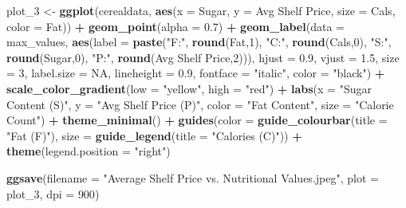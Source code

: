 \documentclass[
]{article}
\newenvironment{Shaded}{\begin{snugshade}}{\end{snugshade}}
\newcommand{\AttributeTok}[1]{\textcolor[rgb]{0.13,0.29,0.53}{#1}}
\newcommand{\ConstantTok}[1]{\textcolor[rgb]{0.56,0.35,0.01}{#1}}
\newcommand{\DecValTok}[1]{\textcolor[rgb]{0.00,0.00,0.81}{#1}}
\newcommand{\FloatTok}[1]{\textcolor[rgb]{0.00,0.00,0.81}{#1}}
\newcommand{\FunctionTok}[1]{\textcolor[rgb]{0.13,0.29,0.53}{\textbf{#1}}}
\newcommand{\NormalTok}[1]{#1}
\newcommand{\OtherTok}[1]{\textcolor[rgb]{0.56,0.35,0.01}{#1}}
\newcommand{\SpecialCharTok}[1]{\textcolor[rgb]{0.81,0.36,0.00}{\textbf{#1}}}
\newcommand{\StringTok}[1]{\textcolor[rgb]{0.31,0.60,0.02}{#1}}
\begin{document}
\begin{Shaded}
\begin{Highlighting}[]
\NormalTok{plot\_3 }\OtherTok{\textless{}{-}} \FunctionTok{ggplot}\NormalTok{(cerealdata, }\FunctionTok{aes}\NormalTok{(}\AttributeTok{x =}\NormalTok{ Sugar, }\AttributeTok{y =} \StringTok{\textasciigrave{}}\AttributeTok{Avg Shelf Price}\StringTok{\textasciigrave{}}\NormalTok{, }\AttributeTok{size =}\NormalTok{ Cals, }\AttributeTok{color =}\NormalTok{ Fat)) }\SpecialCharTok{+}
  \FunctionTok{geom\_point}\NormalTok{(}\AttributeTok{alpha =} \FloatTok{0.7}\NormalTok{) }\SpecialCharTok{+}
  \FunctionTok{geom\_label}\NormalTok{(}\AttributeTok{data =}\NormalTok{ max\_values, }
             \FunctionTok{aes}\NormalTok{(}\AttributeTok{label =} \FunctionTok{paste}\NormalTok{(}\StringTok{"F:"}\NormalTok{, }\FunctionTok{round}\NormalTok{(Fat,}\DecValTok{1}\NormalTok{), }\StringTok{"C:"}\NormalTok{, }\FunctionTok{round}\NormalTok{(Cals,}\DecValTok{0}\NormalTok{), }\StringTok{"S:"}\NormalTok{, }\FunctionTok{round}\NormalTok{(Sugar,}\DecValTok{0}\NormalTok{), }\StringTok{"P:"}\NormalTok{, }\FunctionTok{round}\NormalTok{(}\StringTok{\textasciigrave{}}\AttributeTok{Avg Shelf Price}\StringTok{\textasciigrave{}}\NormalTok{,}\DecValTok{2}\NormalTok{))), }
             \AttributeTok{hjust =} \FloatTok{0.9}\NormalTok{, }\AttributeTok{vjust =} \FloatTok{1.5}\NormalTok{, }
             \AttributeTok{size =} \DecValTok{3}\NormalTok{,}
             \AttributeTok{label.size =} \ConstantTok{NA}\NormalTok{,}
             \AttributeTok{lineheight =} \FloatTok{0.9}\NormalTok{, }
             \AttributeTok{fontface =} \StringTok{"italic"}\NormalTok{, }
             \AttributeTok{color =} \StringTok{"black"}\NormalTok{) }\SpecialCharTok{+}
  \FunctionTok{scale\_color\_gradient}\NormalTok{(}\AttributeTok{low =} \StringTok{"yellow"}\NormalTok{, }\AttributeTok{high =} \StringTok{"red"}\NormalTok{) }\SpecialCharTok{+}
  \FunctionTok{labs}\NormalTok{(}\AttributeTok{x =} \StringTok{"Sugar Content (S)"}\NormalTok{, }
       \AttributeTok{y =} \StringTok{"Avg Shelf Price (P)"}\NormalTok{, }
       \AttributeTok{color =} \StringTok{"Fat Content"}\NormalTok{, }
       \AttributeTok{size =} \StringTok{"Calorie Count"}\NormalTok{) }\SpecialCharTok{+}
  \FunctionTok{theme\_minimal}\NormalTok{() }\SpecialCharTok{+}
  \FunctionTok{guides}\NormalTok{(}\AttributeTok{color =} \FunctionTok{guide\_colourbar}\NormalTok{(}\AttributeTok{title =} \StringTok{"Fat (F)"}\NormalTok{), }\AttributeTok{size =} \FunctionTok{guide\_legend}\NormalTok{(}\AttributeTok{title =} \StringTok{"Calories (C)"}\NormalTok{)) }\SpecialCharTok{+}
  \FunctionTok{theme}\NormalTok{(}\AttributeTok{legend.position =} \StringTok{"right"}\NormalTok{)}


\FunctionTok{ggsave}\NormalTok{(}\AttributeTok{filename =} \StringTok{"Average Shelf Price vs. Nutritional Values.jpeg"}\NormalTok{, }\AttributeTok{plot =}\NormalTok{ plot\_3, }\AttributeTok{dpi =} \DecValTok{900}\NormalTok{)}
\end{Highlighting}
\end{Shaded}
\end{document}
